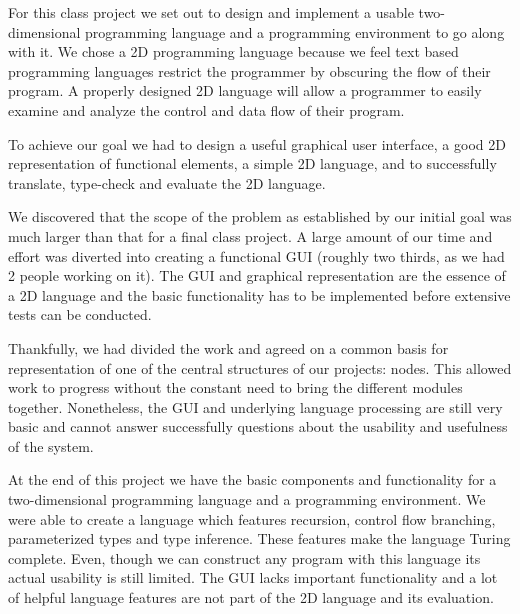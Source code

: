 \documentclass[12pt,UTF8,a4]{article}
\begin{document}
For this class project we set out to design and implement a usable two-dimensional programming language and a programming environment to go along with it. We chose a 2D programming language because we feel text based programming languages restrict the programmer by obscuring the flow of their program. A properly designed 2D language will allow a programmer to easily examine and analyze the control and data flow of their program.

To achieve our goal we had to design a useful graphical user interface, a good 2D representation of functional elements, a simple 2D language, and to successfully translate, type-check and evaluate the 2D language.

We discovered that the scope of the problem as established by our initial goal was much larger than that for a final class project. A large amount of our time and effort was diverted into creating a functional GUI (roughly two thirds, as we had 2 people working on it). The GUI and graphical representation are the essence of a 2D language and the basic functionality has to be implemented before extensive tests can be conducted.

Thankfully, we had divided the work and agreed on a common basis for representation of one of the central structures of our projects: nodes. This allowed work to progress without the constant need to bring the different modules together. Nonetheless, the GUI and underlying language processing are still very basic and cannot answer successfully questions about the usability and usefulness of the system.

At the end of this project we have the basic components and functionality for a two-dimensional programming language and a programming environment. We were able to create a language which features recursion, control flow branching, parameterized types and type inference. These features make the language Turing complete. Even, though we can construct any program with this language its actual usability is still limited. The GUI lacks important functionality and a lot of helpful language features are not part of the 2D language and its evaluation.
\end{document}
